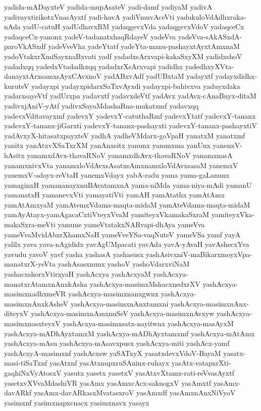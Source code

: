 {yadida-mADayxteV
yadida-mupAsateV
yadi-damf
yadiyaM
yadivA
yadivayxtirikotxVnasAyxtf
yadi-havA
yadiVmuvAceVti
yadukuloVdAdhxraka-nAda
yadU-catuH
yadUdhavxRM
yadaqgevxVda
yadaqgevxVdoV
yadaqceCx
yadaqceCx-yanonx
yadeV-tadanatxhaqRdayeV
yadeVva
yadeVva-sAkASxdA-paroVkASxdf
yadeVveVha
yadeYtatf
yadeYta-manu-pashayxtAyxtAmxnaM
yadoVtakxrXmiSayxnaBxvati
yadf
yadadxsArxvapi-kakaSxyXM
yadidxshoV
yadadxqq
yadedxVtadadhxqq
yadadxrXsArxvapi
yadidhx
yadedhxyXVta-danayxtArxsamxsAyxCAvxnoV
yadABxvAdf
yadUBxtaM
yadayxtf
yadayxdidhx-kuruteV
yadayxpi
yadayxpidarxSaTxvAyxdi
yadayxpi-bahivxva
yaduyxdaka
yadarxsayeVtf
yadUrxpa
yadavxtf
yadavxdeVtf
yadAvx
yadAvx-cAnaBuyx-ditaM
yadivxjAniV-yAtf
yadivxSayaMdashaRna-mukatxmf
yadavxqq
yadevxVditavayxmf
yadevxY
yadevxY-catuthaRmf
yadevxYtatf
yadevxY-tananx
yadevxY-tananx-jiGarxti
yadevxY-tananx-pashayxti
yadevxY-tananx-pashayxtiV
yadAvxyX-hitasatxpayxteV
yadhA
yadheVMdarx-goVpaH
yanatxM
yanatxmf
yanitx
yanAtxvXSaTxrXM
yanAnxsitx
yanunx
yanunxma
yanUnx
yanenxV-hAsitx
yanamxdAvx-thavaRNoV
yanamxdhAvx-thavaRNoV
yanamxnasA
yanamxnivxVta
yanamxloVdAvxsAsatxsAmxnamxloVdAvxsasaM
yanemxV
yanemxV-adayx-reVtaH
yanemxVdayx
yabA-radu
yama
yama-gaLanunx
yamaginxH
yamananayxnuBAvatamxnA
yama-niMda
yama-niya-mAdi
yamanU
yamanatxH
yamanevxVti
yamayatiVti
yamAH
yamAtathx
yamAtAmx
yamAtAmxyaM
yamAtemxVdama-maqta-midaM
yamAteVdama-maqta-midaM
yamAyAtayx-yamAgacaCxtiVteyxVvaM
yamiteyxVkamakaSxraM
yamiteyxVka-makaSxra-meVti
yamune
yameVtatakxNARvapi-dhAya
yameVva
yameVvaMvidAbxrXhamxNaH
yameVveYSa-vaqNuteV
yameVSa
yamf
yayA
yalilx
yava
yava-nAgididx
yavAgUMpacati
yavAda
yavA-yAvaH
yavAshecxYva
yavudu
yavoV
yavf
yasha
yashasA
yashasusx
yashAsivxniV-maBikarxmoyxVpa-manatxrX-yeVta
yashAsasxnunx
yashoV
yashoVdarxviNaM
yashacxshorxVtirxyaH
yashAcxya
yashAcxyaM
yashAcxya-manatxrAtamxnAnxkAsha
yashAcxya-masimxMshacxnedxrXV
yashAcxya-masimxnadhxmeVR
yashAcxya-masimxnanxgwnx
yashAcxya-masimxnAnxkAsheV
yashAcxya-masimxnAnxtamxni
yashAcxya-masimxnAnx-diteyxV
yashAcxya-masimxnAmxnuSeV
yashAcxya-masimxnAvxyw
yashAcxya-masimxnasxteyxV
yashAcxya-masimxsatx-nayitwnx
yashAcxya-masAyxM
yashAcxya-mADhAyxtamxM
yashAcxya-mADhAyxtamxmf
yashAcxya-mAtAmx
yashAcxya-mAsu
yashAcxya-mAsavxpusx
yashAcxya-miti
yashAcx-yamf
yashAcxyA-masimxnf
yashAcxsw
yaSATxyX
yasatxdevxVdoV-BayaM
yasatx-masi-tiSaTxnf
yasAtxnf
yasAtxnupxruSAninx-ruhayx
yasAtx-vatapxrXti-gaqhiNxVyAtosxV
yasutx
yasetx
yasetxV
yasAtxvXtamx-rati-reVvasAyxtf
yasetxvXVvaMdashiVR
yasAmx
yasAmxcAcx-saknogxV
yasAmxtf
yasAmx-davARkf
yasAmx-davARkasxMvatasxroV
yasAmxdf
yasAmxnAnxNiVyoV
yasimxnf
yasimxnapxcnacx
yasimxnavx
yasayx
}
